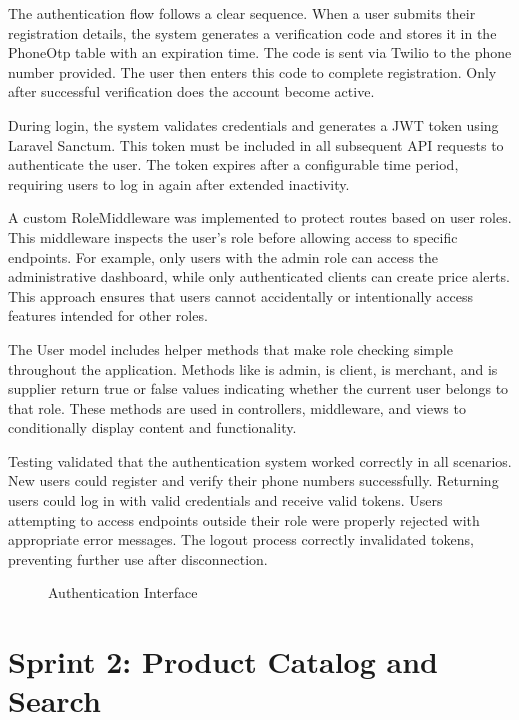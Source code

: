 The authentication flow follows a clear sequence. When a user
submits their registration details, the system generates a
verification code and stores it in the PhoneOtp table with an
expiration time. The code is sent via Twilio to the phone number
provided. The user then enters this code to complete registration.
Only after successful verification does the account become active.

During login, the system validates credentials and generates a
JWT token using Laravel Sanctum. This token must be included in
all subsequent API requests to authenticate the user. The token
expires after a configurable time period, requiring users to
log in again after extended inactivity.

A custom RoleMiddleware was implemented to protect routes based
on user roles. This middleware inspects the user's role before
allowing access to specific endpoints. For example, only users
with the admin role can access the administrative dashboard,
while only authenticated clients can create price alerts. This
approach ensures that users cannot accidentally or intentionally
access features intended for other roles.

The User model includes helper methods that make role checking
simple throughout the application. Methods like is admin,
is client, is merchant, and is supplier return true or false
values indicating whether the current user belongs to that
role. These methods are used in controllers, middleware, and
views to conditionally display content and functionality.

Testing validated that the authentication system worked correctly
in all scenarios. New users could register and verify their
phone numbers successfully. Returning users could log in with
valid credentials and receive valid tokens. Users attempting
to access endpoints outside their role were properly rejected
with appropriate error messages. The logout process correctly
invalidated tokens, preventing further use after disconnection.

\begin{figure}[H]
\begin{center}
\end{center}
\caption{Authentication Interface}
\label{fig:auth_interface}
\end{figure}

\section*{Sprint 2: Product Catalog and Search}

